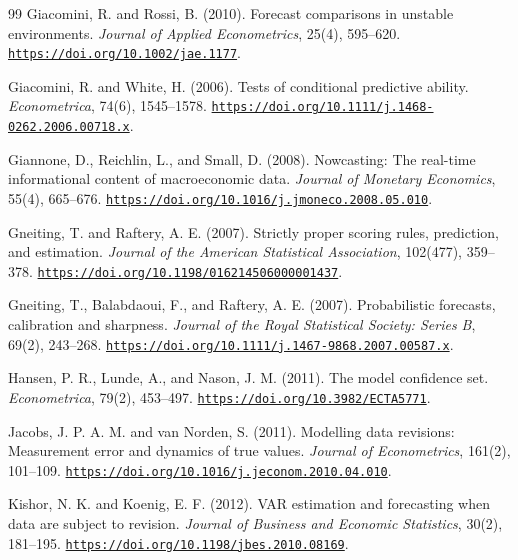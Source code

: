 \documentclass[12pt]{article}
\begin{document}
\begin{thebibliography}{99}
Giacomini, R. and Rossi, B. (2010).
Forecast comparisons in unstable environments.
\emph{Journal of Applied Econometrics}, 25(4), 595--620. \href{https://doi.org/10.1002/jae.1177}{\nolinkurl{https://doi.org/10.1002/jae.1177}}.

Giacomini, R. and White, H. (2006).
Tests of conditional predictive ability.
\emph{Econometrica}, 74(6), 1545--1578. \href{https://doi.org/10.1111/j.1468-0262.2006.00718.x}{\nolinkurl{https://doi.org/10.1111/j.1468-0262.2006.00718.x}}.

Giannone, D., Reichlin, L., and Small, D. (2008).
Nowcasting: The real-time informational content of macroeconomic data.
\emph{Journal of Monetary Economics}, 55(4), 665--676. \href{https://doi.org/10.1016/j.jmoneco.2008.05.010}{\nolinkurl{https://doi.org/10.1016/j.jmoneco.2008.05.010}}.

Gneiting, T. and Raftery, A. E. (2007).
Strictly proper scoring rules, prediction, and estimation.
\emph{Journal of the American Statistical Association}, 102(477), 359--378. \href{https://doi.org/10.1198/016214506000001437}{\nolinkurl{https://doi.org/10.1198/016214506000001437}}.

Gneiting, T., Balabdaoui, F., and Raftery, A. E. (2007).
Probabilistic forecasts, calibration and sharpness.
\emph{Journal of the Royal Statistical Society: Series B}, 69(2), 243--268. \href{https://doi.org/10.1111/j.1467-9868.2007.00587.x}{\nolinkurl{https://doi.org/10.1111/j.1467-9868.2007.00587.x}}.

Hansen, P. R., Lunde, A., and Nason, J. M. (2011).
The model confidence set.
\emph{Econometrica}, 79(2), 453--497. \href{https://doi.org/10.3982/ECTA5771}{\nolinkurl{https://doi.org/10.3982/ECTA5771}}.

Jacobs, J. P. A. M. and van Norden, S. (2011).
Modelling data revisions: Measurement error and dynamics of true values.
\emph{Journal of Econometrics}, 161(2), 101--109. \href{https://doi.org/10.1016/j.jeconom.2010.04.010}{\nolinkurl{https://doi.org/10.1016/j.jeconom.2010.04.010}}.

Kishor, N. K. and Koenig, E. F. (2012).
VAR estimation and forecasting when data are subject to revision.
\emph{Journal of Business and Economic Statistics}, 30(2), 181--195. \href{https://doi.org/10.1198/jbes.2010.08169}{\nolinkurl{https://doi.org/10.1198/jbes.2010.08169}}.


\end{thebibliography}
\end{document}
